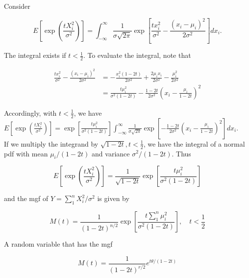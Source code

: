 Consider

$$
E\left[\exp \left(\frac{t X_{i}^{2}}{\sigma^{2}}\right)\right]=\int_{-\infty}^{\infty} \frac{1}{\sigma \sqrt{2 \pi}} \exp \left[\frac{t x_{i}^{2}}{\sigma^{2}}-\frac{\left(x_{i}-\mu_{i}\right)^{2}}{2 \sigma^{2}}\right] d x_{i} .
$$

The integral exists if $t<\frac{1}{2}$. To evaluate the integral, note that

$$
\begin{aligned}
\frac{t x_{i}^{2}}{\sigma^{2}}-\frac{\left(x_{i}-\mu_{i}\right)^{2}}{2 \sigma^{2}} & =-\frac{x_{i}^{2}(1-2 t)}{2 \sigma^{2}}+\frac{2 \mu_{i} x_{i}}{2 \sigma^{2}}-\frac{\mu_{i}^{2}}{2 \sigma^{2}} \\
& =\frac{t \mu_{i}^{2}}{\sigma^{2}(1-2 t)}-\frac{1-2 t}{2 \sigma^{2}}\left(x_{i}-\frac{\mu_{i}}{1-2 t}\right)^{2}
\end{aligned}
$$

Accordingly, with $t<\frac{1}{2}$, we have\\
$E\left[\exp \left(\frac{t X_{i}^{2}}{\sigma^{2}}\right)\right]=\exp \left[\frac{t \mu_{i}^{2}}{\sigma^{2}(1-2 t)}\right] \int_{-\infty}^{\infty} \frac{1}{\sigma \sqrt{2 \pi}} \exp \left[-\frac{1-2 t}{2 \sigma^{2}}\left(x_{i}-\frac{\mu_{i}}{1-2 t}\right)^{2}\right] d x_{i}$.\\
If we multiply the integrand by $\sqrt{1-2 t}, t<\frac{1}{2}$, we have the integral of a normal pdf with mean $\mu_{i} /(1-2 t)$ and variance $\sigma^{2} /(1-2 t)$. Thus

$$
E\left[\exp \left(\frac{t X_{i}^{2}}{\sigma^{2}}\right)\right]=\frac{1}{\sqrt{1-2 t}} \exp \left[\frac{t \mu_{i}^{2}}{\sigma^{2}(1-2 t)}\right]
$$

and the mgf of $Y=\sum_{1}^{n} X_{i}^{2} / \sigma^{2}$ is given by


\begin{equation*}
M(t)=\frac{1}{(1-2 t)^{n / 2}} \exp \left[\frac{t \sum_{1}^{n} \mu_{i}^{2}}{\sigma^{2}(1-2 t)}\right], \quad t<\frac{1}{2} \tag{9.3.1}
\end{equation*}


A random variable that has the mgf


\begin{equation*}
M(t)=\frac{1}{(1-2 t)^{r / 2}} e^{t \theta /(1-2 t)} \tag{9.3.2}
\end{equation*}


